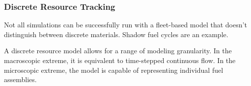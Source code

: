 \subsubsection{Discrete Resource Tracking}

Not all simulations can be successfully run with a fleet-based model that 
doesn't distinguish between discrete materials. Shadow fuel cycles are an 
example. 

A discrete resource model allows for a range of modeling granularity. In the
macroscopic extreme, it is equivalent to time-stepped continuous flow. In the
microscopic extreme, the model is capable of representing individual fuel
assemblies.

